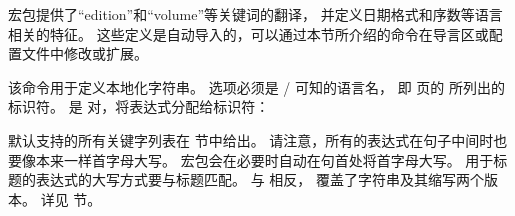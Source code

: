 \biblatex 宏包提供了“edition”和“volume”等关键词的翻译，
并定义日期格式和序数等语言相关的特征。
这些定义是自动导入的，可以通过本节所介绍的命令在导言区或配置文件中修改或扩展。

\begin{ltxsyntax}



该命令用于定义本地化字符串。
 选项必须是 / 可知的语言名，
即 \pageref{bib:fld:tab1} 页的 所列出的标识符。
 是 \keyval 对，将表达式分配给标识符：

\begin{ltxexample}
\end{ltxexample}
%
默认支持的所有关键字列表在  节中给出。
请注意，所有的表达式在句子中间时也要像本来一样首字母大写。
\biblatex 宏包会在必要时自动在句首处将首字母大写。
用于标题的表达式的大写方式要与标题匹配。
与  相反， 覆盖了字符串及其缩写两个版本。
详见  节。




\end{ltxsyntax}
